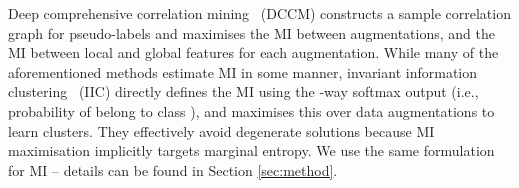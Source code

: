 \documentclass[runningheads]{llncs}
\begin{document}
Deep comprehensive correlation mining~\cite{wu2019deep} (DCCM) constructs a sample correlation graph for pseudo-labels and maximises the MI between augmentations, and the MI between local and global features for each augmentation. While many of the aforementioned methods estimate MI in some manner, invariant information clustering~\cite{ji2019invariant} (IIC) directly defines the MI using the -way softmax output (i.e., probability of belong to class ), and maximises this over data augmentations to learn clusters. They effectively avoid degenerate solutions because MI maximisation implicitly targets marginal entropy. We use the same formulation for MI -- details can be found in Section \ref{sec:method}.












































  
\end{document}
